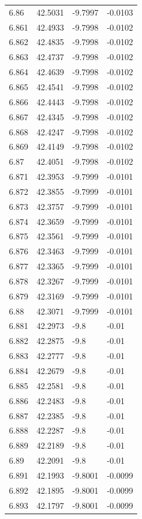 \begin{tabular}{llll}
6.86 & 42.5031 & -9.7997 & -0.0103 \\
6.861 & 42.4933 & -9.7998 & -0.0102 \\
6.862 & 42.4835 & -9.7998 & -0.0102 \\
6.863 & 42.4737 & -9.7998 & -0.0102 \\
6.864 & 42.4639 & -9.7998 & -0.0102 \\
6.865 & 42.4541 & -9.7998 & -0.0102 \\
6.866 & 42.4443 & -9.7998 & -0.0102 \\
6.867 & 42.4345 & -9.7998 & -0.0102 \\
6.868 & 42.4247 & -9.7998 & -0.0102 \\
6.869 & 42.4149 & -9.7998 & -0.0102 \\
6.87 & 42.4051 & -9.7998 & -0.0102 \\
6.871 & 42.3953 & -9.7999 & -0.0101 \\
6.872 & 42.3855 & -9.7999 & -0.0101 \\
6.873 & 42.3757 & -9.7999 & -0.0101 \\
6.874 & 42.3659 & -9.7999 & -0.0101 \\
6.875 & 42.3561 & -9.7999 & -0.0101 \\
6.876 & 42.3463 & -9.7999 & -0.0101 \\
6.877 & 42.3365 & -9.7999 & -0.0101 \\
6.878 & 42.3267 & -9.7999 & -0.0101 \\
6.879 & 42.3169 & -9.7999 & -0.0101 \\
6.88 & 42.3071 & -9.7999 & -0.0101 \\
6.881 & 42.2973 & -9.8 & -0.01 \\
6.882 & 42.2875 & -9.8 & -0.01 \\
6.883 & 42.2777 & -9.8 & -0.01 \\
6.884 & 42.2679 & -9.8 & -0.01 \\
6.885 & 42.2581 & -9.8 & -0.01 \\
6.886 & 42.2483 & -9.8 & -0.01 \\
6.887 & 42.2385 & -9.8 & -0.01 \\
6.888 & 42.2287 & -9.8 & -0.01 \\
6.889 & 42.2189 & -9.8 & -0.01 \\
6.89 & 42.2091 & -9.8 & -0.01 \\
6.891 & 42.1993 & -9.8001 & -0.0099 \\
6.892 & 42.1895 & -9.8001 & -0.0099 \\
6.893 & 42.1797 & -9.8001 & -0.0099 \\

\end{tabular}
